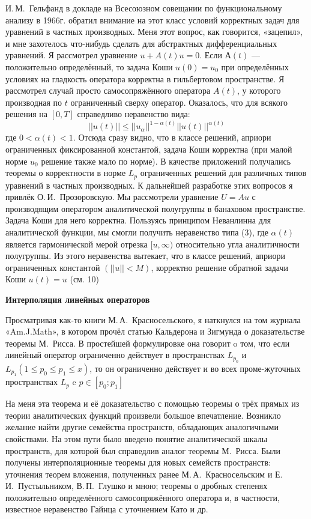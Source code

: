 И.\,М.~Гельфанд в докладе на Всесоюзном совещании по функциональному анализу в 1966г. обратил внимание на этот класс условий корректных задач для уравнений в частных производных. Меня этот вопрос, как говорится, «зацепил», и мне захотелось что-нибудь сделать для абстрактных дифференциальных уравнений. Я рассмотрел уравнение $u + A(t)u = 0$. Если $А(t)$ --- положительно определённый, то задача Коши $u(0)=u_0$ при определённых условиях на гладкость оператора корректна в гильбертовом пространстве. Я рассмотрел случай просто самосопряжённого оператора $A(t)$, у которого производная по $t$ ограниченный сверху оператор. Оказалось, что для всякого решения на $[0,T]$ справедливо неравенство вида:
$$||u(t)||\leqslant||u_{\alpha}||^{1-\alpha(t)} ||u(t)||^{\alpha(t)}$$
где $0<\alpha(t) < 1$.
Отсюда сразу видно, что в классе решений, априори ограниченных фиксированной константой,
задача Коши корректна (при малой норме $u_0$ решение также мало по норме).
В качестве приложений получались теоремы о корректности в норме $L_p$
ограниченных решений для различных типов уравнений в частных производных.
К дальнейшей разработке этих вопросов я привлёк О.\,И.~Прозоровскую. Мы рассмотрели уравнение $U = Au$ с производящим оператором аналитической полугруппы в банаховом пространстве. Задача Коши для него корректна. Пользуясь принципом Неванлинна для аналитической функции, мы смогли получить неравенство типа (3), где $\alpha(t)$
является гармонической мерой отрезка $[u, \infty)$  относительно угла аналитичности полугруппы. Из этого неравенства вытекает, что в классе решений, априори ограниченных константой $(||u||<M)$, корректно решение обратной задачи Коши $u(t) = u$ (см. 10)

{\bf Интерполяция линейных операторов}

Просматривая как-то книги М.\,А.~Красносельского, я наткнулся на том журнала «Am.J.Math»,
в котором прочёл статью Кальдерона и Зигмунда о доказательстве теоремы М.~Рисса.
В простейшей формулировке она говорит o том, что если линейный оператор ограниченно действует в пространствах $L_{p_0}$ и  $L_{p_1} (1\leqslant p_0 \leqslant p_1 \leqslant x)$, то он ограниченно действует и во всех проме-жуточных пространствах $L_p$ c $p \in [p_0;p_1]$

На меня эта теорема и её доказательство с помощью теоремы о трёх прямых из теории аналитических функций произвели большое впечатление. Возникло желание найти другие семейства пространств, обладающих аналогичными свойствами. На этом пути было введено понятие аналитической шкалы пространств, для которой был справедлив аналог теоремы М.~Рисса. Были получены интерполяционные теоремы для новых семейств пространств: уточнения теорем вложения, полученных ранее М.\,А.~Красносельским и Е.\,И.~Пустыльником, В.\,П.~Глушко и мною; теоремы о дробных степенях положительно определённого самосопряжённого оператора и, в частности, известное неравенство Гайнца с уточнением Като и др.

